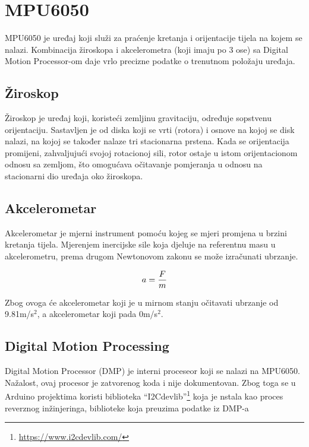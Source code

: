 \documentclass[../Document.tex]{subfiles}
\begin{document}
\section{MPU6050} \label{mpu}

MPU6050 je uređaj koji služi za praćenje kretanja i orijentacije tijela na kojem se nalazi. Kombinacija žiroskopa i akcelerometra (koji imaju po 3 ose) sa Digital Motion Processor-om\cite{mpu} daje vrlo precizne podatke o trenutnom položaju uređaja.

\subsection{Žiroskop}
Žiroskop je uređaj koji, koristeći zemljinu gravitaciju, određuje sopstvenu orijentaciju. Sastavljen je od diska koji se vrti (rotora) i osnove na kojoj se disk nalazi, na kojoj se također nalaze tri stacionarna prstena. Kada se orijentacija promijeni, zahvaljujući svojoj rotacionoj sili, rotor ostaje u istom orijentacionom odnosu sa zemljom, što omogućava očitavanje pomjeranja u odnosu na stacionarni dio uređaja oko žiroskopa.


\subsection{Akcelerometar}
Akcelerometar je mjerni instrument pomoću kojeg se mjeri promjena u brzini kretanja tijela. Mjerenjem inercijske sile koja djeluje na referentnu masu u akcelerometru, prema drugom Newtonovom zakonu se može izračunati ubrzanje.

$$
    \centering
    a = \frac{F}{m}
$$

\noindent Zbog ovoga će akcelerometar koji je u mirnom stanju očitavati ubrzanje od 9.81m/s$^2$, a akcelerometar koji pada 0m/s$^2$.

\subsection{Digital Motion Processing}\label{dmp}

Digital Motion Processor (DMP) je interni proceseor koji se nalazi na MPU6050. Nažalost, ovaj procesor je zatvorenog koda i nije dokumentovan. Zbog toga se u Arduino projektima koristi biblioteka ``I2Cdevlib''\footnote{\url{https://www.i2cdevlib.com/}} koja je nstala kao proces reverznog inžinjeringa, biblioteke koja preuzima podatke iz DMP-a
\end{document}
